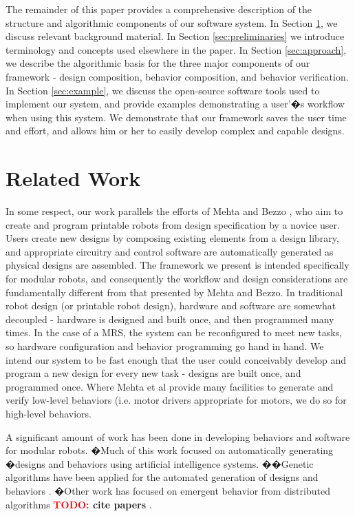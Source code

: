 \documentclass[conference]{IEEEtran}
\theoremstyle{definition}
\newcommand{\TODO}[1]{ {\bf \textcolor{red}{TODO:} #1 }}
\begin{document}
The remainder of this paper provides a comprehensive description of the
structure and algorithmic components of our software system.  In Section \ref{sec:related-work},
we discuss relevant background material.
In Section \ref{sec:preliminaries} we introduce terminology and  concepts used elsewhere in the
paper. 
In Section \ref{sec:approach}, we describe the algorithmic basis
for the three major components of our framework - design composition, behavior
composition, and behavior verification.  In Section
\ref{sec:example}, we discuss the open-source software
tools used to implement our system, and provide examples demonstrating a user'�s
workflow when using this system.  We demonstrate that our framework saves the
user time and effort, and allows him or her to easily develop complex and
capable designs.


\section{Related Work}
\label{sec:related-work}
In some respect, our work parallels the efforts of Mehta \cite{mehta2014design}
and Bezzo \cite{bezzo2014demo}, who aim to create and program printable robots from
design specification by a novice user.  Users create new designs by composing
existing elements from a design library, and appropriate circuitry and
control software are automatically generated as physical designs are assembled. The framework we present is
intended specifically for modular robots, and consequently the workflow and design considerations are fundamentally different
from that presented by Mehta and Bezzo.  In
traditional robot design (or printable robot design), hardware and software are somewhat
decoupled - hardware is
designed and built once, and then programmed many times.  In the case of a MRS, the system can be reconfigured to meet new tasks,
so hardware configuration and behavior programming go hand in hand.  We intend
our system to be fast enough that the user could conceivably develop and program
a new design for every new task - designs are built once, and programmed once.  Where Mehta et al provide many facilities to generate and verify
low-level behaviors (i.e. motor drivers appropriate for motors, we do so for
high-level behaviors.

A significant amount of work has been done in developing behaviors and software
for modular robots. �Much of this work focused on automatically
generating �designs and behaviors using artificial intelligence systems. ��Genetic
algorithms have been applied for the automated generation of designs
and behaviors \cite{hornby2003generative}. �Other work has
focused on emergent behavior from distributed algorithms \TODO{cite papers}.
\end{document}
